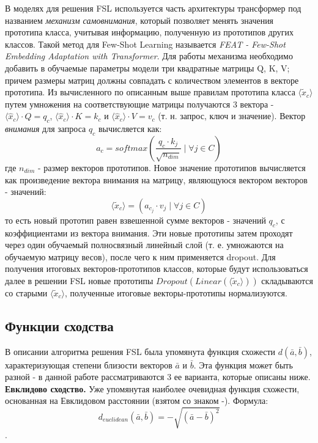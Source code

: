\documentclass[a4paper, 12pt]{report}
\begin{document}
В моделях для решения FSL используется часть архитектуры трансформер под названием \textit{механизм самовнимания}, который позволяет менять значения прототипа класса, учитывая информацию, полученную из прототипов других классов. Такой метод для Few-Shot Learning называется \textit{FEAT - Few-Shot Embedding Adaptation with Transformer}. Для работы механизма необходимо добавить в обучаемые параметры модели три квадратные матрицы Q, K, V; причем размеры матриц должны совпадать с количеством элементов в векторе прототипа. Из вычисленного по описанным выше правилам прототипа класса $\langle \tilde{x}_c \rangle$ путем умножения на соответствующие матрицы получаются 3 вектора - $\langle \hat{x}_c \rangle \cdot Q = q_{c}$, $\langle \hat{x}_c \rangle \cdot K = k_{c}$ и $\langle \hat{x}_c \rangle \cdot V = v_{c}$ (т. н. запрос, ключ и значение). Вектор \textit{внимания} для запроса $q_{c}$ вычисляется как: $$a_{c} = softmax\left(\frac{q_{c} \cdot k_{j}}{\sqrt{n_{dim}}} \; | \;  \forall j \in C \right)$$ где $n_{dim}$ - размер векторов прототипов. Новое значение прототипов вычисляется как произведение вектора внимания на матрицу, являющуюся вектором векторов - значений: $$\langle \tilde{x}_c \rangle =\left(  a_{c_j} \cdot  v_{j}  \; | \;  \forall j \in C  \right)$$ то есть новый прототип равен взвешенной сумме векторов - значений $q_{c}$, с коэффициентами из вектора внимания. Эти новые прототипы затем проходят через один обучаемый полносвязный линейный слой (т. е. умножаются на обучаемую матрицу весов), после чего к ним применяется dropout. Для получения итоговых векторов-прототипов классов, которые будут использоваться далее в решении FSL новые прототипы $Dropout \left(Linear \left( \langle \tilde{x}_c \rangle \right) \right)$ складываются со старыми $\langle \tilde{x}_c \rangle$, полученные итоговые векторы-прототипы нормализуются.

\subsection{Функции сходства}

В описании алгоритма решения FSL была упомянута функция схожести $d(\bar{a}, \bar{b})$, характеризующая степени близости векторов $\bar{a}$ и $\bar{b}$. Эта функция может быть разной - в данной работе рассматриваются 3 ее варианта, которые описаны ниже. \\

\textbf {Евклидово сходство.} Уже упомянутая наиболее очевидная функция схожести, основанная на Евклидовом расстоянии (взятом со знаком -). Формула: $$d_{euclidean}(\bar{a}, \bar{b}) = -\sqrt{{(\bar{a} - \bar{b})}^2}$$.\\
\end{document}
